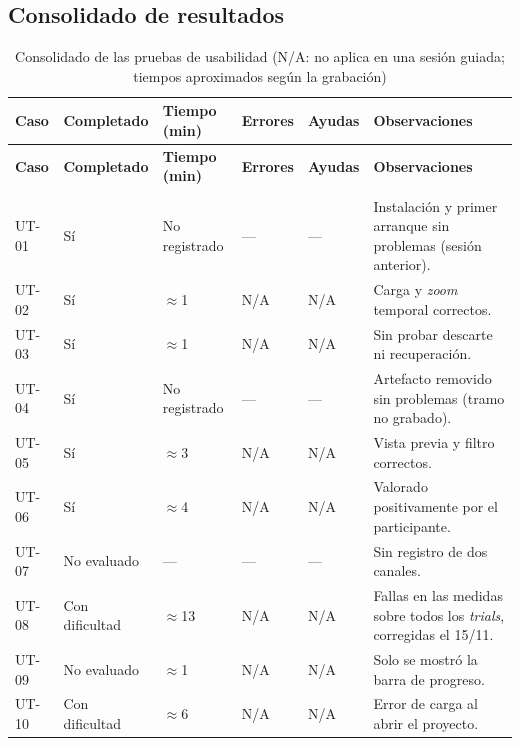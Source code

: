 \documentclass[12pt,letterpaper,oneside]{article}
\DeclareRobustCommand{\_}{\textunderscore\allowbreak}
\begin{document}
\subsection{Consolidado de resultados}

\begin{center}
\footnotesize
\begin{longtable}{|>{\raggedright\arraybackslash}p{}|>{\centering\arraybackslash}p{}|>{\centering\arraybackslash}p{}|>{\centering\arraybackslash}p{}|>{\centering\arraybackslash}p{}|>{\raggedright\arraybackslash}p{}|}
\hline
\textbf{Caso} & \textbf{Completado} & \textbf{Tiempo (min)} & \textbf{Errores} & \textbf{Ayudas} & \textbf{Observaciones} \\
\hline
\endfirsthead
\hline
\textbf{Caso} & \textbf{Completado} & \textbf{Tiempo (min)} & \textbf{Errores} & \textbf{Ayudas} & \textbf{Observaciones} \\
\hline
\endhead
\hline
\endfoot
\hline
\caption{Consolidado de las pruebas de usabilidad (N/A: no aplica en una sesión guiada; tiempos aproximados según la grabación)} \label{tab:td_ut_consolidado} \\
\endlastfoot
UT-01 & Sí & No registrado & --- & --- & Instalación y primer arranque sin problemas (sesión anterior). \\
\hline
UT-02 & Sí & $\approx$1 & N/A & N/A & Carga y \textit{zoom} temporal correctos. \\
\hline
UT-03 & Sí & $\approx$1 & N/A & N/A & Sin probar descarte ni recuperación. \\
\hline
UT-04 & Sí & No registrado & --- & --- & Artefacto removido sin problemas (tramo no grabado). \\
\hline
UT-05 & Sí & $\approx$3 & N/A & N/A & Vista previa y filtro correctos. \\
\hline
UT-06 & Sí & $\approx$4 & N/A & N/A & Valorado positivamente por el participante. \\
\hline
UT-07 & No evaluado & --- & --- & --- & Sin registro de dos canales. \\
\hline
UT-08 & Con dificultad & $\approx$13 & N/A & N/A & Fallas en las medidas sobre todos los \textit{trials}, corregidas el 15/11. \\
\hline
UT-09 & No evaluado & $\approx$1 & N/A & N/A & Solo se mostró la barra de progreso. \\
\hline
UT-10 & Con dificultad & $\approx$6 & N/A & N/A & Error de carga al abrir el proyecto. \\
\hline
\end{longtable}
\end{center}
\end{document}
